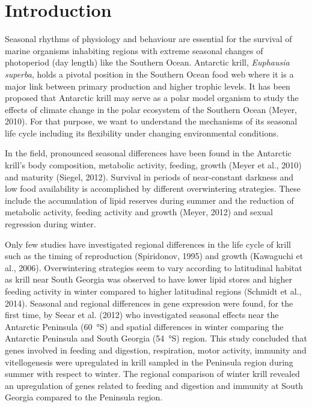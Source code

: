 \section{Introduction}

Seasonal rhythms of physiology and behaviour are essential for the survival of
marine organisms inhabiting regions with extreme seasonal changes of
photoperiod (day length) like the Southern Ocean. Antarctic krill,
\textit{Euphausia superba}, holds a pivotal position in the Southern Ocean food
web where it is a major link between primary production and higher trophic
levels. It has been proposed that Antarctic krill may serve as a polar model
organism to study the effects of climate change in the polar ecosystem of the
Southern Ocean (Meyer, 2010). For that purpose, we want to understand the
mechanisms of its seasonal life cycle including its flexibility under changing
environmental conditions.

In the field, pronounced seasonal differences have been found in the Antarctic
krill's body composition, metabolic activity, feeding, growth (Meyer et al.,
2010) and maturity (Siegel, 2012). Survival in periods of near-constant
darkness and low food availability is accomplished by different overwintering
strategies. These include the accumulation of lipid reserves during summer and
the reduction of metabolic activity, feeding activity and growth (Meyer, 2012)
and sexual regression during winter.

Only few studies have investigated regional differences in the life cycle of
krill such as the timing of reproduction (Spiridonov, 1995) and growth
(Kawaguchi et al., 2006). Overwintering strategies seem to vary according to
latitudinal habitat as krill near South Georgia was observed to have lower
lipid stores and higher feeding activity in winter compared to higher
latitudinal regions (Schmidt et al., 2014). Seasonal and regional differences
in gene expression were found, for the first time, by Seear et al. (2012) who
investigated seasonal effects near the Antarctic Peninsula (\SI{60}{\degree}S) and
spatial differences in winter comparing the Antarctic Peninsula and South
Georgia (\SI{54}{\degree}S) region. This study concluded that genes involved in
feeding and digestion, respiration, motor activity, immunity and vitellogenesis
were upregulated in krill sampled in the Peninsula region during summer with
respect to winter. The regional comparison of winter krill revealed an
upregulation of genes related to feeding and digestion and immunity at South
Georgia compared to the Peninsula region.

